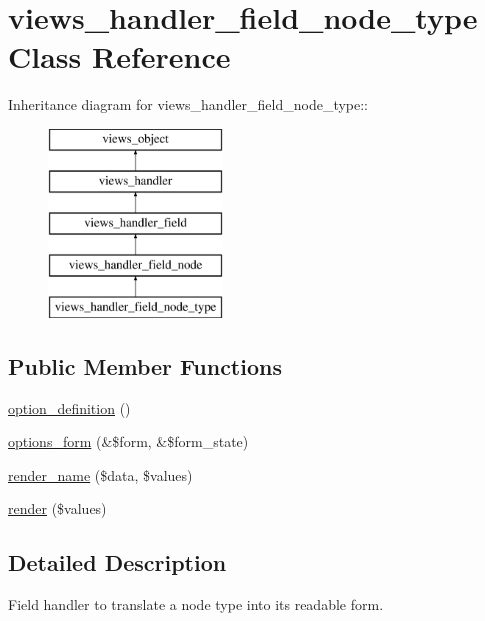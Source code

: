 \hypertarget{classviews__handler__field__node__type}{
\section{views\_\-handler\_\-field\_\-node\_\-type Class Reference}
\label{classviews__handler__field__node__type}
}
Inheritance diagram for views\_\-handler\_\-field\_\-node\_\-type::\begin{figure}[H]
\begin{center}
\leavevmode
\includegraphics[height=5cm]{classviews__handler__field__node__type}
\end{center}
\end{figure}
\subsection*{Public Member Functions}
\begin{CompactItemize}
\item 
\hyperlink{classviews__handler__field__node__type_4e50103a014bff96644915cb0c8d33fd}{option\_\-definition} ()
\item 
\hyperlink{classviews__handler__field__node__type_0152124a453b32265e512bace19d6de4}{options\_\-form} (\&\$form, \&\$form\_\-state)
\item 
\hyperlink{classviews__handler__field__node__type_16f19e2f652fd883b10a568eba122d5b}{render\_\-name} (\$data, \$values)
\item 
\hyperlink{classviews__handler__field__node__type_13c9a516cca49870a1603fdd26071851}{render} (\$values)
\end{CompactItemize}


\subsection{Detailed Description}
Field handler to translate a node type into its readable form. 

